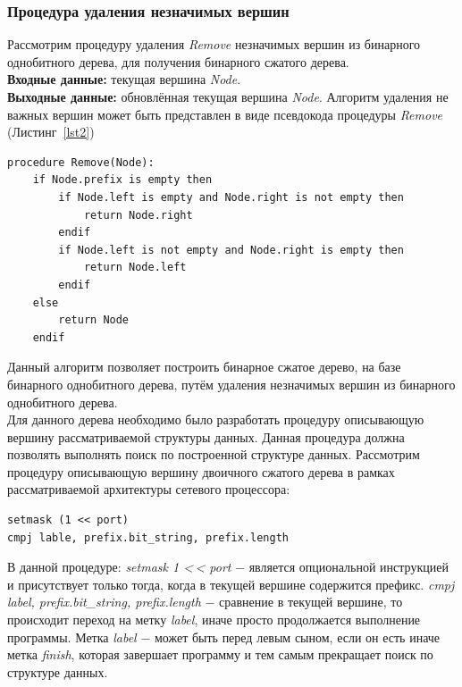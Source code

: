 \documentclass[9pt,a4paper]{article}
\begin{document}
            \subsubsection{Процедура удаления незначимых вершин}
                Рассмотрим процедуру удаления \emph{Remove} незначимых вершин из бинарного однобитного дерева, для получения бинарного сжатого дерева.\\
                {\bf Входные данные:} текущая вершина \emph{Node}.\\
                {\bf Выходные данные:} обновлённая текущая вершина \emph{Node}.
                Алгоритм удаления не важных вершин может быть представлен в виде псевдокода процедуры \emph{Remove} (Листинг~\ref{lst2})
\\
\begin{center} 
\begin{lstlisting}[caption=Процедура удаления незначимых вершин., label=lst2]
procedure Remove(Node):
    if Node.prefix is empty then
        if Node.left is empty and Node.right is not empty then
            return Node.right
        endif
        if Node.left is not empty and Node.right is empty then
            return Node.left
        endif
    else
        return Node
    endif
\end{lstlisting}
\end{center}
\vspace{1em}
            Данный алгоритм позволяет построить бинарное сжатое дерево, на базе бинарного однобитного дерева, путём удаления незначимых вершин из бинарного однобитного дерева.\\
            Для данного дерева необходимо было разработать процедуру описывающую вершину рассматриваемой структуры данных. Данная процедура должна позволять выполнять
            поиск по построенной структуре данных.
            Рассмотрим процедуру описывающую вершину двоичного сжатого дерева в рамках рассматриваемой архитектуры сетевого процессора:
\\
\begin{lstlisting}[caption=Процедура описывающая вершину бинарном сжатом дереве.]
setmask (1 << port)
cmpj lable, prefix.bit_string, prefix.length
\end{lstlisting}
\vspace{1em}
            В данной процедуре: 
            \emph{setmask 1 <\,< port} $-$ является опциональной инструкцией и присутствует только тогда, когда в текущей вершине содержится префикс.
            \emph{cmpj label, prefix.bit\_string, prefix.length} $-$ сравнение в текущей вершине, то происходит переход на метку \emph{label}, иначе просто продолжается выполнение программы.
            Метка \emph{label} $-$ может быть перед левым сыном, если он есть иначе метка \emph{finish}, 
            которая завершает программу и тем самым прекращает поиск по структуре данных.
\end{document}
